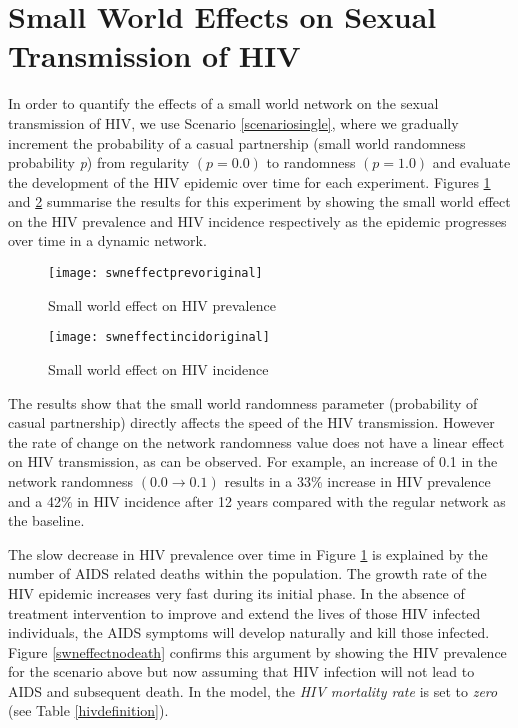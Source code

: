 \section{Small World Effects on Sexual Transmission of HIV}\label{sweffecthiv}

In order to quantify the effects of a small world network on the sexual transmission of
HIV, we use Scenario \ref{scenariosingle}, where we gradually increment the probability
of a casual partnership (small world randomness probability \emph{p}) from regularity $(p
= 0.0)$ to randomness $(p = 1.0)$ and evaluate the development of the HIV epidemic over
time for each experiment.  Figures \ref{swneffectprevoriginal} and
\ref{swneffectincidoriginal} summarise the results for this experiment by showing the
small world effect on the HIV prevalence and HIV incidence respectively as the epidemic
progresses over time in a dynamic network.

\begin{figure}[ht]
\texttt{[image: swneffectprevoriginal]}
\caption{Small world effect on HIV prevalence} \label{swneffectprevoriginal}
\end{figure}
\begin{figure}[ht]
\texttt{[image: swneffectincidoriginal]}
\caption{Small world effect on HIV incidence} \label{swneffectincidoriginal}
\end{figure}
\clearpage

The results show that the small world randomness parameter (probability of casual
partnership) directly affects the speed of the HIV transmission. However the rate of
change on the network randomness value does not have a linear effect on HIV transmission,
as can be observed. For example, an increase of 0.1 in the network randomness $(0.0
\rightarrow 0.1)$ results in a 33\% increase in HIV prevalence and a 42\% in HIV
incidence after 12 years compared with the regular network as the baseline.

The slow decrease in HIV prevalence over time in Figure \ref{swneffectprevoriginal} is
explained by the number of AIDS related deaths within the population. The growth rate of
the HIV epidemic increases very fast during its initial phase. In the absence of
treatment intervention to improve and extend the lives of those HIV infected individuals,
the AIDS symptoms will develop naturally and kill those infected. Figure
\ref{swneffectnodeath} confirms this argument by showing the HIV prevalence for the
scenario above but now assuming that HIV infection will not lead to AIDS and subsequent
death. In the model, the \emph{HIV mortality rate} is set to \emph{zero} (see Table
\ref{hivdefinition}).

